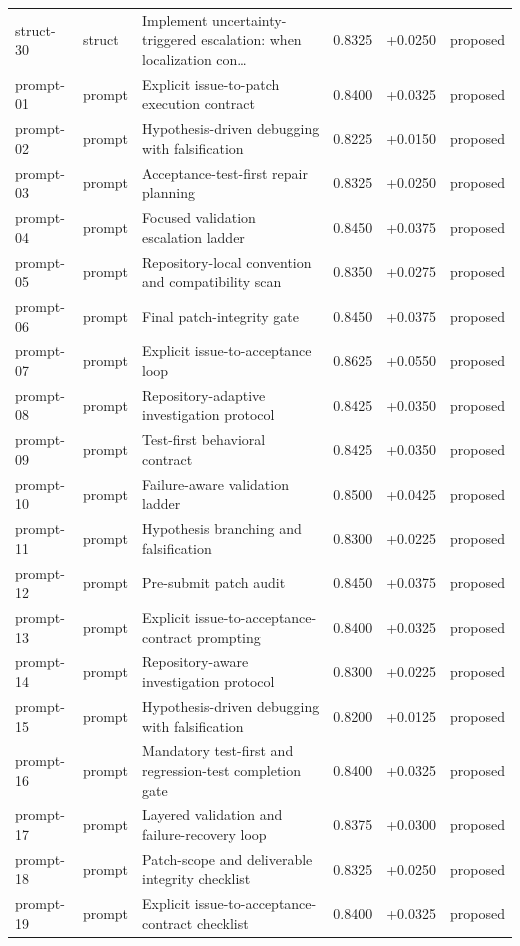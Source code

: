 \begin{center}
\begin{longtable}{llp{5.2cm}rrl}
struct-30 & struct & Implement uncertainty-triggered escalation: when localization con\ldots{} & 0.8325 & +0.0250 & proposed \\
prompt-01 & prompt & Explicit issue-to-patch execution contract & 0.8400 & +0.0325 & proposed \\
prompt-02 & prompt & Hypothesis-driven debugging with falsification & 0.8225 & +0.0150 & proposed \\
prompt-03 & prompt & Acceptance-test-first repair planning & 0.8325 & +0.0250 & proposed \\
prompt-04 & prompt & Focused validation escalation ladder & 0.8450 & +0.0375 & proposed \\
prompt-05 & prompt & Repository-local convention and compatibility scan & 0.8350 & +0.0275 & proposed \\
prompt-06 & prompt & Final patch-integrity gate & 0.8450 & +0.0375 & proposed \\
prompt-07 & prompt & Explicit issue-to-acceptance loop & 0.8625 & +0.0550 & proposed \\
prompt-08 & prompt & Repository-adaptive investigation protocol & 0.8425 & +0.0350 & proposed \\
prompt-09 & prompt & Test-first behavioral contract & 0.8425 & +0.0350 & proposed \\
prompt-10 & prompt & Failure-aware validation ladder & 0.8500 & +0.0425 & proposed \\
prompt-11 & prompt & Hypothesis branching and falsification & 0.8300 & +0.0225 & proposed \\
prompt-12 & prompt & Pre-submit patch audit & 0.8450 & +0.0375 & proposed \\
prompt-13 & prompt & Explicit issue-to-acceptance-contract prompting & 0.8400 & +0.0325 & proposed \\
prompt-14 & prompt & Repository-aware investigation protocol & 0.8300 & +0.0225 & proposed \\
prompt-15 & prompt & Hypothesis-driven debugging with falsification & 0.8200 & +0.0125 & proposed \\
prompt-16 & prompt & Mandatory test-first and regression-test completion gate & 0.8400 & +0.0325 & proposed \\
prompt-17 & prompt & Layered validation and failure-recovery loop & 0.8375 & +0.0300 & proposed \\
prompt-18 & prompt & Patch-scope and deliverable integrity checklist & 0.8325 & +0.0250 & proposed \\
prompt-19 & prompt & Explicit issue-to-acceptance-contract checklist & 0.8400 & +0.0325 & proposed \\

\end{longtable}
\end{center}
